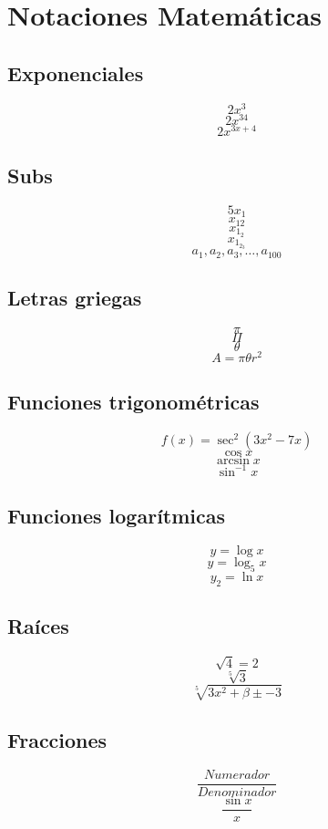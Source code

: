 \documentclass[12pt]{article}
\begin{document}
\section{Notaciones Matemáticas}
\subsection{Exponenciales}
$$2x^3$$
$$2x^{34}$$
$$2x^{3x+4}$$

\subsection{Subs}
$$5x_1$$
$$x_{12}$$
$$x_{1_2}$$
$$x_{1_{2_3}}$$
$$a_1, a_2, a_3, \dots, a_{100}$$ 

\subsection{Letras griegas}
$$\pi$$  %
$$\Pi$$  %
$$\theta$$ %
$$A=\pi \theta r^2$$

\subsection{Funciones trigonométricas}
$$f(x)=\sec^2({3x^2-7x})$$
$$\cos x$$
$$\arcsin x$$
$$\sin^{-1}x$$

\subsection{Funciones logarítmicas}
$$y=\log x$$
$$y=\log_5 x$$
$$y_2=\ln x$$

\subsection{Raíces}
$$\sqrt{4}=2$$
$$\sqrt[5]{3}$$
$$\sqrt[5]{3x^2+\beta\pm-3}$$

\subsection{Fracciones}
$$\frac{Numerador}{Denominador}$$
$$\frac{\sin x}{x}$$
\end{document}
